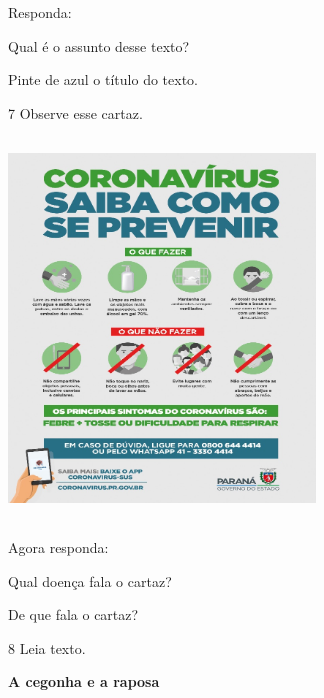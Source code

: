 Responda:

\begin{escolha}
\item Qual é o assunto desse texto?


\item Pinte de azul o título do texto.
\end{escolha}

\num{7} Observe esse cartaz.


\includegraphics[width=3.20896in,height=3.98057in]{media/image120.jpeg}


Agora responda:

\begin{escolha}
\item Qual doença fala o cartaz?


\item De que fala o cartaz?

\end{escolha}

\num{8} Leia texto.

\textbf{A cegonha e a raposa}

